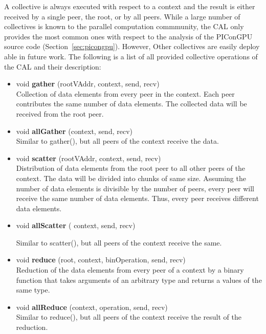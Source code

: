 A collective is always executed with respect to a context and the
result is either received by a single peer, the root, or by all peers.
While a large number of collectives is known to the parallel
computation commmunity, the CAL only provides the most common ones
with respect to the analysis of the PIConGPU source code
(Section~\ref{sec:picongpu}).  However, Other collectives are easily
deploy able in future work. The following is a list of all provided
collective operations of the CAL and their description:


\begin{itemize}
\item  void \textbf{gather} (rootVAddr, context, send, recv)\\
  Collection of data elements from every peer in the context. Each peer
  contributes the same number of data elements. The collected data will
  be received from the root peer.

\item void \textbf{allGather} (context, send, recv)\\
  Similar to gather(), but all peers of the context receive the data.

\item  void \textbf{scatter} (rootVAddr, context, send, recv)\\
  Distribution of data elements from the root peer to all other peers of
  the context. The data will be divided into chunks of same
  size. Assuming the number of data elements is divisible by the number
  of peers, every peer will receive the same number of data
  elements. Thus, every peer receives different data elements.

\item  void \textbf{allScatter} ( context, send, recv)

  Similar to scatter(), but all peers of the context receive the same.

\item  void \textbf{reduce} (root, context, binOperation, send, recv)\\
  Reduction of the data elements from every peer of a context
  by a binary function that takes arguments of an arbitrary type
  and returns a values of the same type.

\item  void \textbf{allReduce}  (context, operation, send, recv)\\
  Similar to reduce(), but all peers of the context receive the
  result of the reduction.


\end{itemize}
